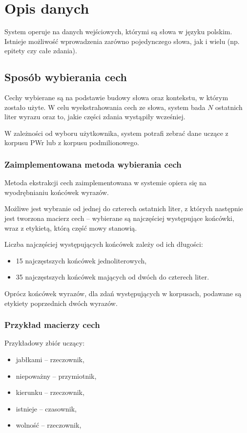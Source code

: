 \section{Opis danych}
	System operuje na danych wejściowych, którymi są słowa w języku polskim.
	Istnieje możliwość wprowadzenia zarówno pojedynczego słowa, jak i wielu (np. epitety czy całe zdania).
	
	\subsection{Sposób wybierania cech}
	Cechy wybierane są na podstawie budowy słowa oraz kontekstu, w którym zostało użyte.
	W celu wyekstrahowania cech ze słowa, system bada $N$ ostatnich liter wyrazu oraz to, jakie części zdania wystąpiły wcześniej.
	
	W zależności od wyboru użytkownika, system potrafi zebrać dane uczące z korpusu PWr lub z korpusu podmilionowego.
	
	\subsubsection{Zaimplementowana metoda wybierania cech}
	Metoda ekstrakcji cech zaimplementowana w systemie opiera się na wyodrębnianiu końcówek wyrazów.
	
	Możliwe jest wybranie od jednej do czterech ostatnich liter, z których następnie jest tworzona macierz cech -- wybierane są najczęściej występujące końcówki, wraz z etykietą, którą część mowy stanowią.
	
	Liczba najczęściej występujących końcówek zależy od ich długości:
	\begin{itemize}
		\item 15 najczęstszych końcówek jednoliterowych,
		\item 35 najczęstszych końcówek mających od dwóch do czterech liter.
	\end{itemize}
	
	Oprócz końcówek wyrazów, dla zdań występujących w korpusach, podawane są etykiety poprzednich dwóch wyrazów.
	
	\subsubsection{Przykład macierzy cech}
	Przykładowy zbiór uczący:
	\begin{itemize}
		\item jabłkami -- rzeczownik,
		\item niepoważny -- przymiotnik,
		\item kierunku -- rzeczownik,
		\item istnieje -- czasownik,
		\item wolność -- rzeczownik,
	\end{itemize}
	
